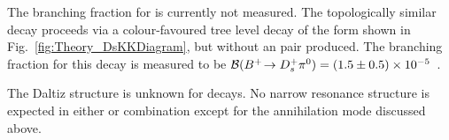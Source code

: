 The branching fraction for \decay{\Bp}{\Dsp\Kp\Km} is currently not measured. The topologically similar decay \decay{\Bp}{\Dsp \piz} proceeds via a colour-favoured tree level decay of the form shown in Fig.~\ref{fig:Theory_DsKKDiagram}, but without an \squark\squarkbar pair produced. The branching fraction for this decay is measured to be $\mathcal{B}({{{B}^+}}\!\rightarrow {\ensuremath{{D}^+_{s}}} {\ensuremath{{\pi}^0}}) = (1.5 \pm 0.5) \times 10^{-5}$~\cite{Aubert:2006xy}. 


The Daltiz structure is unknown for \decay{\Bp}{\Dsp\Kp\Km} decays. No narrow resonance structure is expected in either \Dsp\Km or \Kp\Km combination except for the annihilation mode discussed above.



